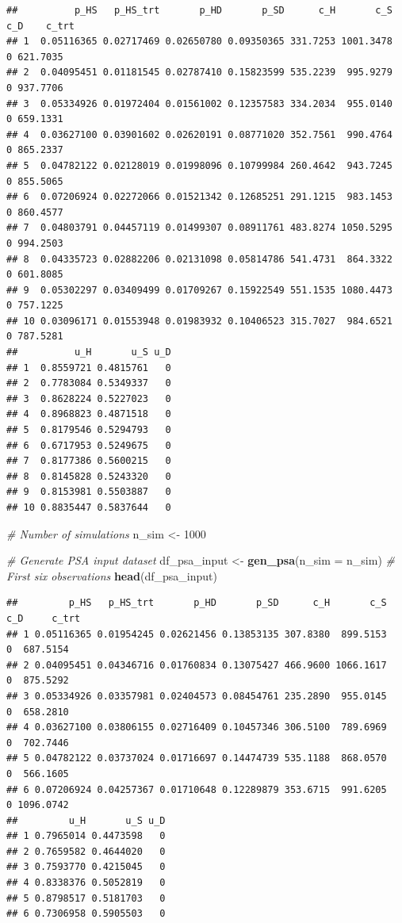 \documentclass[
]{article}
\newenvironment{Shaded}{\begin{snugshade}}{\end{snugshade}}
\newcommand{\CommentTok}[1]{\textcolor[rgb]{0.56,0.35,0.01}{\textit{#1}}}
\newcommand{\DataTypeTok}[1]{\textcolor[rgb]{0.13,0.29,0.53}{#1}}
\newcommand{\DecValTok}[1]{\textcolor[rgb]{0.00,0.00,0.81}{#1}}
\newcommand{\KeywordTok}[1]{\textcolor[rgb]{0.13,0.29,0.53}{\textbf{#1}}}
\newcommand{\NormalTok}[1]{#1}
\newcommand{\StringTok}[1]{\textcolor[rgb]{0.31,0.60,0.02}{#1}}
\begin{document}
\begin{verbatim}
##          p_HS   p_HS_trt       p_HD       p_SD      c_H       c_S c_D    c_trt
## 1  0.05116365 0.02717469 0.02650780 0.09350365 331.7253 1001.3478   0 621.7035
## 2  0.04095451 0.01181545 0.02787410 0.15823599 535.2239  995.9279   0 937.7706
## 3  0.05334926 0.01972404 0.01561002 0.12357583 334.2034  955.0140   0 659.1331
## 4  0.03627100 0.03901602 0.02620191 0.08771020 352.7561  990.4764   0 865.2337
## 5  0.04782122 0.02128019 0.01998096 0.10799984 260.4642  943.7245   0 855.5065
## 6  0.07206924 0.02272066 0.01521342 0.12685251 291.1215  983.1453   0 860.4577
## 7  0.04803791 0.04457119 0.01499307 0.08911761 483.8274 1050.5295   0 994.2503
## 8  0.04335723 0.02882206 0.02131098 0.05814786 541.4731  864.3322   0 601.8085
## 9  0.05302297 0.03409499 0.01709267 0.15922549 551.1535 1080.4473   0 757.1225
## 10 0.03096171 0.01553948 0.01983932 0.10406523 315.7027  984.6521   0 787.5281
##          u_H       u_S u_D
## 1  0.8559721 0.4815761   0
## 2  0.7783084 0.5349337   0
## 3  0.8628224 0.5227023   0
## 4  0.8968823 0.4871518   0
## 5  0.8179546 0.5294793   0
## 6  0.6717953 0.5249675   0
## 7  0.8177386 0.5600215   0
## 8  0.8145828 0.5243320   0
## 9  0.8153981 0.5503887   0
## 10 0.8835447 0.5837644   0
\end{verbatim}

\begin{Shaded}
\begin{Highlighting}[]
\CommentTok{# Number of simulations}
\NormalTok{n_sim <-}\StringTok{ }\DecValTok{1000}

\CommentTok{# Generate PSA input dataset}
\NormalTok{df_psa_input <-}\StringTok{ }\KeywordTok{gen_psa}\NormalTok{(}\DataTypeTok{n_sim =}\NormalTok{ n_sim)}
\CommentTok{# First six observations}
\KeywordTok{head}\NormalTok{(df_psa_input)}
\end{Highlighting}
\end{Shaded}

\begin{verbatim}
##         p_HS   p_HS_trt       p_HD       p_SD      c_H       c_S c_D     c_trt
## 1 0.05116365 0.01954245 0.02621456 0.13853135 307.8380  899.5153   0  687.5154
## 2 0.04095451 0.04346716 0.01760834 0.13075427 466.9600 1066.1617   0  875.5292
## 3 0.05334926 0.03357981 0.02404573 0.08454761 235.2890  955.0145   0  658.2810
## 4 0.03627100 0.03806155 0.02716409 0.10457346 306.5100  789.6969   0  702.7446
## 5 0.04782122 0.03737024 0.01716697 0.14474739 535.1188  868.0570   0  566.1605
## 6 0.07206924 0.04257367 0.01710648 0.12289879 353.6715  991.6205   0 1096.0742
##         u_H       u_S u_D
## 1 0.7965014 0.4473598   0
## 2 0.7659582 0.4644020   0
## 3 0.7593770 0.4215045   0
## 4 0.8338376 0.5052819   0
## 5 0.8798517 0.5181703   0
## 6 0.7306958 0.5905503   0
\end{verbatim}
\end{document}
